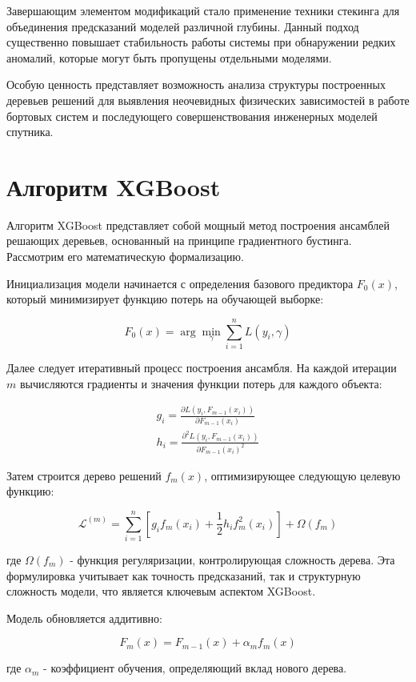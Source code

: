 Завершающим элементом модификаций стало применение техники стекинга для
объединения предсказаний моделей различной глубины. Данный подход существенно
повышает стабильность работы системы при обнаружении редких аномалий, которые
могут быть пропущены отдельными моделями.

Особую ценность представляет возможность анализа структуры построенных деревьев
решений для выявления неочевидных физических зависимостей в работе бортовых
систем и последующего совершенствования инженерных моделей спутника.


\section{Алгоритм XGBoost}

Алгоритм XGBoost представляет собой мощный метод построения ансамблей решающих
деревьев, основанный на принципе градиентного бустинга. Рассмотрим его
математическую формализацию.

Инициализация модели начинается с определения базового предиктора $F_0(x)$,
который минимизирует функцию потерь на обучающей выборке:

\[F_0(x) = \arg \min_{\gamma} \sum_{i=1}^n L(y_i, \gamma)\]

Далее следует итеративный процесс построения ансамбля. На каждой итерации $m$
вычисляются градиенты и значения функции потерь для каждого объекта:

\begin{gather*}
	g_i = \frac{\partial L(y_i, F_{m-1}(x_i))}{\partial F_{m-1}(x_i)}\\
	h_i = \frac{\partial^2 L(y_i, F_{m-1}(x_i))}{\partial F_{m-1}(x_i)^2}
\end{gather*}

Затем строится дерево решений $f_m(x)$, оптимизирующее следующую целевую функцию:

\[\mathcal{L}^{(m)} = \sum_{i=1}^n \left[ g_i f_m(x_i) + \frac{1}{2} h_i f_m^2(x_i) \right] + \Omega(f_m)\]

где $\Omega(f_m)$ - функция регуляризации, контролирующая сложность дерева. Эта
формулировка учитывает как точность предсказаний, так и структурную сложность
модели, что является ключевым аспектом XGBoost.

Модель обновляется аддитивно:

\[F_m(x) = F_{m-1}(x) + \alpha_m f_m(x)\]

где $\alpha_m$ - коэффициент обучения, определяющий вклад нового дерева.

